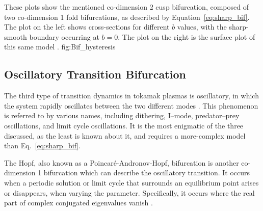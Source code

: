 	{These plots show the mentioned co-dimension 2 cusp bifurcation, composed of two co-dimension 1 fold bifurcations, as described by Equation~\ref{eq:sharp_bif}.
	The plot on the left shows cross-sections for different $b$ values, with the sharp-smooth boundary occurring at $b = 0$.
	The plot on the right is the surface plot of this same model \cite{weymiens_bifurcation_2014}.}
	{fig:Bif_hysteresis}

\subsection{Oscillatory Transition Bifurcation}
The third type of transition dynamics in tokamak plasmas is oscillatory, in which the system rapidly oscillates between the two different modes \cite{ryter_survey_2013, zohm_mhd_1995}.
This phenomenon is referred to by various names, including dithering, I--mode, predator--prey oscillations, and limit cycle oscillations.
It is the most enigmatic of the three discussed, as the least is known about it, and requires a more-complex model than Eq.~\ref{eq:sharp_bif}.

The Hopf, also known as a Poincar\'e-Andronov-Hopf, bifurcation is another co-dimension 1 bifurcation which can describe the oscillatory transition.
It occurs when a periodic solution or limit cycle that surrounds an equilibrium point arises or disappears, when varying the parameter.
Specifically, it occurs where the real part of complex conjugated eigenvalues vanish \cite{munoz-alicea_introduction_2011}.

